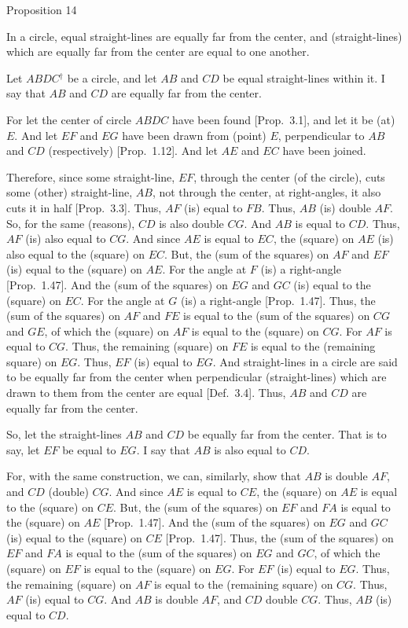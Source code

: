 
\begin{center}
{\large Proposition 14}
\end{center}

In  a circle, equal straight-lines are equally far from the center, and
(straight-lines) which are equally far from the center are equal to one another.

\epsfysize=2.2in
\centerline{}

Let $ABDC$$^\dag$ be a circle, and let $AB$ and $CD$ be equal straight-lines within it.
I say that $AB$ and $CD$ are equally far from the center.

For let the center of circle $ABDC$ have been found [Prop.~3.1], and
let it be (at) $E$. And let $EF$ and $EG$ have been drawn from (point) $E$, perpendicular
to $AB$ and $CD$ (respectively) [Prop.~1.12]. And let $AE$ and $EC$ have been joined.

Therefore, since some straight-line, $EF$, through the center (of the circle),
cuts some (other) straight-line, $AB$, not through the center, at right-angles,
it also cuts it in half [Prop.~3.3]. Thus, $AF$ (is) equal to $FB$. Thus, 
$AB$ (is) double $AF$. So, for the same (reasons), $CD$ is also double $CG$.
And $AB$ is equal to $CD$. Thus, $AF$ (is) also equal to $CG$. And since
$AE$ is equal to $EC$, the (square) on $AE$ (is) also equal to the (square)
on $EC$. But, the (sum of the squares) on $AF$
and $EF$ (is) equal to the (square) on $AE$. For the angle at $F$ (is) a right-angle [Prop.~1.47]. And the
(sum of the squares) on $EG$ and $GC$ (is) equal to the (square) on $EC$. For the angle at $G$ (is) a right-angle [Prop.~1.47]. Thus, the (sum of the squares)
on $AF$ and $FE$ is equal to the (sum of the squares) on $CG$ and $GE$, 
of which
the (square) on $AF$ is equal to the (square) on $CG$. For $AF$ is equal to
$CG$. Thus, the remaining (square) on $FE$ is equal to the (remaining square) on  $EG$. Thus, $EF$ (is) equal to $EG$. And straight-lines in a circle are said to be equally far from the center when perpendicular (straight-lines)
which are drawn to them from the center  are equal [Def.~3.4]. Thus, $AB$ and
$CD$ are equally far from the center.

So, let the straight-lines $AB$ and $CD$ be equally far from the center. That is to say, let $EF$ be equal to $EG$. I say that $AB$ is also equal to $CD$.

For, with the same construction,  we can, similarly, show that
$AB$ is double $AF$, and $CD$ (double) $CG$. And since $AE$ is equal to $CE$, the (square) on $AE$ is equal to the (square) on $CE$. But, the (sum of the squares)
on $EF$ and $FA$ is equal to the (square) on $AE$ [Prop.~1.47]. And the (sum of
the squares) on $EG$ and $GC$ (is) equal to the (square) on $CE$ [Prop.~1.47]. Thus, the (sum of the squares) on $EF$ and $FA$ is equal to the (sum of the squares) on $EG$ and $GC$, of which the (square) on $EF$ is equal to the (square)
on $EG$. For $EF$ (is) equal to $EG$. Thus, the remaining (square) on  $AF$ is equal to the (remaining square) on  $CG$. Thus, $AF$ (is) equal to $CG$. And $AB$ is double $AF$, and
$CD$ double $CG$. Thus, $AB$ (is) equal to $CD$.

